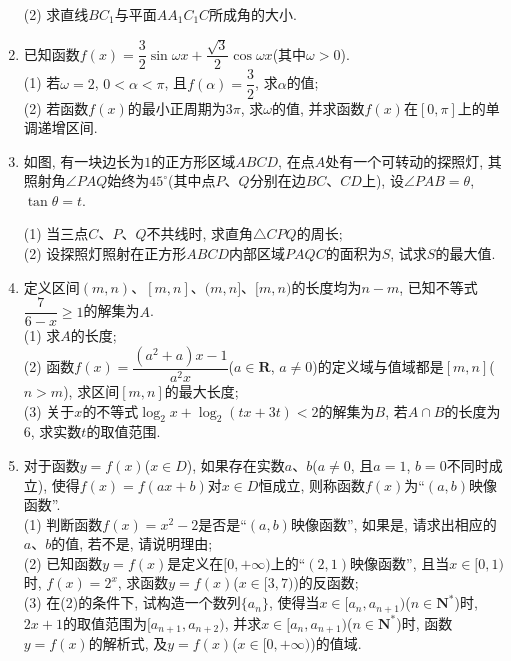\documentclass[10pt,a4paper]{article}
\begin{document}
\begin{enumerate}[1.]
(2) 求直线$BC_1$与平面$AA_1C_1C$所成角的大小.
\item 已知函数$f(x)=\dfrac 32\sin \omega x+\dfrac{\sqrt 3}2\cos \omega x$(其中$\omega >0$).\\
(1)	若$\omega =2$, $0<\alpha <\pi$, 且$f(\alpha)=\dfrac 32$, 求$\alpha$的值;\\
(2)	若函数$f(x)$的最小正周期为$3\pi$, 求$\omega$的值, 并求函数$f(x)$在$[0,\pi]$上的单调递增区间.
\item 如图, 有一块边长为$1$的正方形区域$ABCD$, 在点$A$处有一个可转动的探照灯, 其照射角$\angle PAQ$始终为$45^\circ$(其中点$P$、$Q$分别在边$BC$、$CD$上), 设$\angle PAB=\theta$, $\tan \theta =t$.
\begin{center}
\end{center}
(1) 当三点$C$、$P$、$Q$不共线时, 求直角$\triangle CPQ$的周长;\\
(2) 设探照灯照射在正方形$ABCD$内部区域$PAQC$的面积为$S$, 试求$S$的最大值.
\item 定义区间$(m,n)$、$[m,n]$、$(m,n]$、$[m,n)$的长度均为$n-m$, 已知不等式$\dfrac 7{6-x}\ge 1$的解集为$A$.\\
(1) 求$A$的长度;\\
(2) 函数$f(x)=\dfrac{(a^2+a)x-1}{a^2x}$($a\in \mathbf{R}$, $a\ne 0$)的定义域与值域都是$[m,n]$($n>m$), 求区间$[m,n]$的最大长度;\\
(3) 关于$x$的不等式$\log_2x+\log_2(tx+3t)<2$的解集为$B$, 若$A\cap B$的长度为$6$, 求实数$t$的取值范围.
\item 对于函数$y=f(x)$($x\in D$), 如果存在实数$a$、$b$($a\ne 0$, 且$a=1$, $b=0$不同时成立), 使得$f(x)=f(ax+b)$对$x\in D$恒成立, 则称函数$f(x)$为``$(a,b)$映像函数''.\\
(1) 判断函数$f(x)=x^2-2$是否是``$(a,b)$映像函数'', 如果是, 请求出相应的$a$、$b$的值, 若不是, 请说明理由;\\
(2) 已知函数$y=f(x)$是定义在$[0,+\infty)$上的``$(2,1)$映像函数'', 且当$x\in [0,1)$时, $f(x)=2^x$, 求函数$y=f(x)$($x\in [3,7)$)的反函数;\\
(3) 在(2)的条件下, 试构造一个数列$\{a_n\}$, 使得当$x\in [a_n,{a_{n+1}})$($n\in \mathbf{N}^*$)时, $2x+1$的取值范围为$[{a_{n+1}},{a_{n+2}})$, 并求$x\in [a_n,{a_{n+1}})$($n\in \mathbf{N}^*$)时, 函数$y=f(x)$的解析式, 及$y=f(x)$($x\in [0,+\infty)$)的值域.


\end{enumerate}
\end{document}
